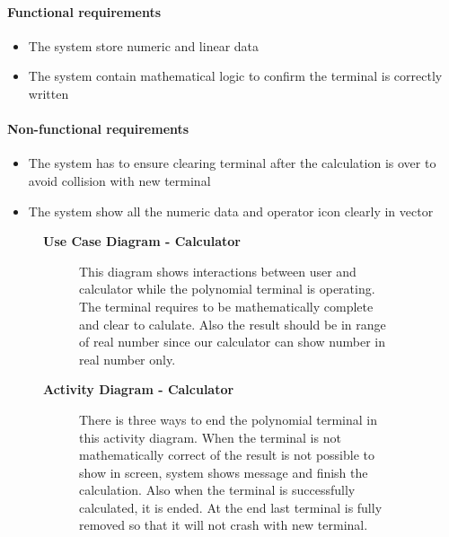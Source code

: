 \documentclass{article}
\begin{document}
		\paragraph{Functional requirements}
		\begin{itemize}
			\item The system store numeric and linear data
			\item The system contain mathematical logic to confirm the terminal is correctly written
		\end{itemize}
		
		\paragraph{Non-functional requirements}
		\begin{itemize}
			\item The system has to ensure clearing terminal after the calculation is over to avoid collision with new terminal
			\item The system show all the numeric data and operator icon clearly in vector
		\end{itemize}
		\newpage
		
		\begin{figure}[htbp]
			\textbf{Use Case Diagram - Calculator}
			\centering
			\begin{subfigure}{\textwidth}
				\resizebox{\textwidth}{!}{}
			\end{subfigure}
			\begin{subfigure}{\textwidth}
				This diagram shows interactions between user and calculator while the polynomial terminal is operating. The terminal requires to be mathematically complete and clear to calulate. Also the result should be in range of real number since our calculator can show number in real number only.
			\end{subfigure}
		\end{figure}
		\clearpage
		
		\begin{figure}[htbp]
			\textbf{Activity Diagram - Calculator}
			\centering
			\begin{subfigure}{\textwidth}
				\centering
				\scalebox{1.0}{}
			\end{subfigure}
			\begin{subfigure}{\textwidth}
				There is three ways to end the polynomial terminal in this activity diagram. When the terminal is not mathematically correct of the result is not possible to show in screen, system shows message and finish the calculation. Also when the terminal is successfully calculated, it is ended. At the end last terminal is fully removed so that it will not crash with new terminal.
			\end{subfigure}
		\end{figure}
		\clearpage
		
\end{document}
